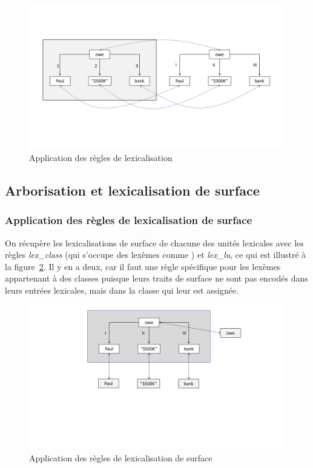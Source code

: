 \begin{figure}[htb]
	\centering
	\includegraphics[width=1\textwidth, trim = {0cm 5.3cm 0cm 4.2cm},clip]{ch3/figs/lexical_2.pdf}
	\caption{Application des règles de lexicalisation}
	\label{fig:lexstand2}
\end{figure}

\subsection{Arborisation et lexicalisation de surface}

\subsubsection{Application des règles de lexicalisation de surface}

On récupère les lexicalisations de surface de chacune des unités lexicales avec les règles \emph{lex\_class} (qui s'occupe des lexèmes comme ) et \emph{lex\_lu}, ce qui est illustré à la figure~\ref{fig:lexsurf}. Il y en a deux, car il faut une règle spécifique pour les lexèmes appartenant à des classes puisque leurs traits de surface ne sont pas encodés dans leurs entrées lexicales, mais dans la classe qui leur est assignée.

\begin{figure}[htb]
	\centering
	\includegraphics[width=1\textwidth, trim = {0cm 8cm 0cm 0.5cm},clip]{ch3/figs/lex_surf_gendr.pdf}
	\caption{Application des règles de lexicalisation de surface}
	\label{fig:lexsurf}
\end{figure}

